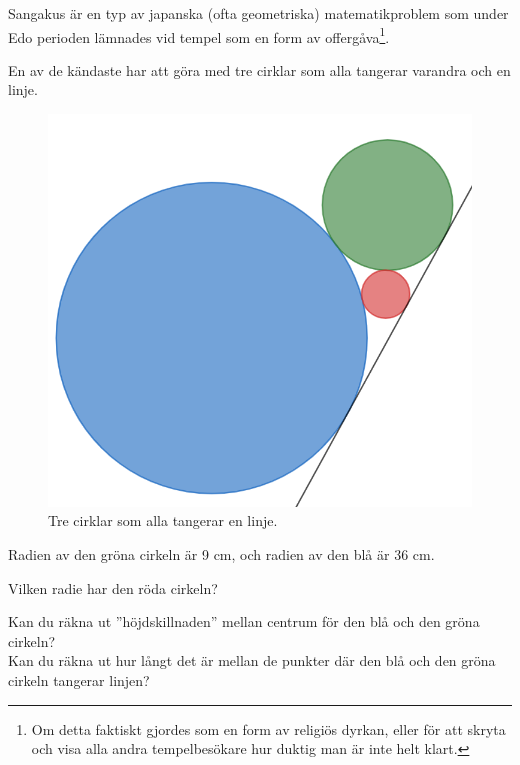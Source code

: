 
Sangakus är en typ av japanska (ofta geometriska) matematikproblem som under Edo perioden lämnades vid tempel som en form av offergåva\footnote{Om detta faktiskt gjordes som en form av religiös dyrkan, eller för att skryta och visa alla andra tempelbesökare hur duktig man är inte helt klart.}.

En av de kändaste har att göra med tre cirklar som alla tangerar varandra och en linje.
\begin{figure}[H]
    \centering
    \includegraphics[width=0.5\linewidth]{img/tre cirklar.png}
    \caption{Tre cirklar som alla tangerar en linje.}
\end{figure}


Radien av den gröna cirkeln är 9 cm, och radien av den blå är 36 cm.

Vilken radie har den röda cirkeln?

\begin{rem}
    Kan du räkna ut ''höjdskillnaden'' mellan centrum för den blå och den gröna cirkeln?\\
    Kan du räkna ut hur långt det är mellan de punkter där den blå och den gröna cirkeln tangerar linjen?
\end{rem}